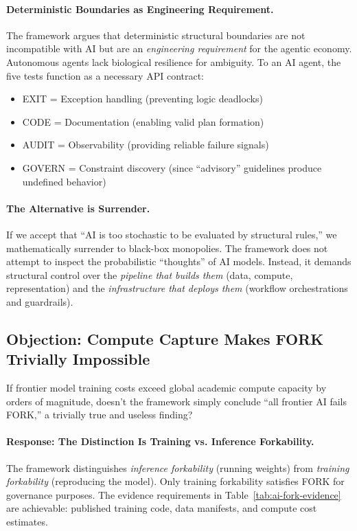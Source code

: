 \documentclass[11pt,a4paper]{article}
\theoremstyle{definition}
\begin{document}
\paragraph{Deterministic Boundaries as Engineering Requirement.} The framework argues that deterministic structural boundaries are not incompatible with AI but are an \textit{engineering requirement} for the agentic economy. Autonomous agents lack biological resilience for ambiguity. To an AI agent, the five tests function as a necessary API contract:

\begin{itemize}[noitemsep]
    \item EXIT = Exception handling (preventing logic deadlocks)
    \item CODE = Documentation (enabling valid plan formation)
    \item AUDIT = Observability (providing reliable failure signals)
    \item GOVERN = Constraint discovery (since ``advisory'' guidelines produce undefined behavior)
\end{itemize}

\paragraph{The Alternative is Surrender.} If we accept that ``AI is too stochastic to be evaluated by structural rules,'' we mathematically surrender to black-box monopolies. The framework does not attempt to inspect the probabilistic ``thoughts'' of AI models. Instead, it demands structural control over the \textit{pipeline that builds them} (data, compute, representation) and the \textit{infrastructure that deploys them} (workflow orchestrations and guardrails).

\subsection{Objection: Compute Capture Makes FORK Trivially Impossible}

If frontier model training costs exceed global academic compute capacity by orders of magnitude, doesn't the framework simply conclude ``all frontier AI fails FORK,'' a trivially true and useless finding?

\paragraph{Response: The Distinction Is Training vs. Inference Forkability.} The framework distinguishes \textit{inference forkability} (running weights) from \textit{training forkability} (reproducing the model). Only training forkability satisfies FORK for governance purposes. The evidence requirements in Table~\ref{tab:ai-fork-evidence} are achievable: published training code, data manifests, and compute cost estimates.
\end{document}
